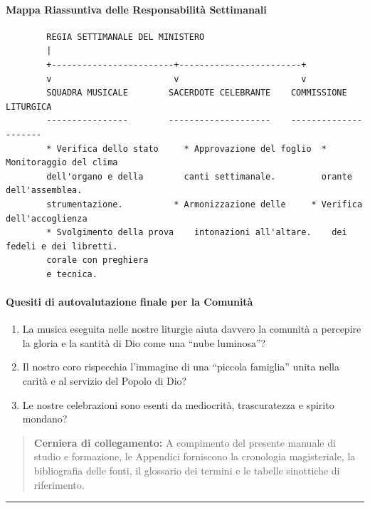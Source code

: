 \documentclass[12pt,a4paper]{article}
\begin{document}
	\paragraph{Mappa Riassuntiva delle Responsabilità Settimanali}\label{mappa-riassuntiva-delle-responsabilita-settimanali}
	
	\begin{verbatim}
		REGIA SETTIMANALE DEL MINISTERO
		|
		+------------------------+------------------------+
		v                        v                        v
		SQUADRA MUSICALE        SACERDOTE CELEBRANTE    COMMISSIONE LITURGICA
		----------------        --------------------    ---------------------
		* Verifica dello stato     * Approvazione del foglio  * Monitoraggio del clima
		dell'organo e della        canti settimanale.         orante dell'assemblea.
		strumentazione.          * Armonizzazione delle     * Verifica dell'accoglienza
		* Svolgimento della prova    intonazioni all'altare.    dei fedeli e dei libretti.
		corale con preghiera
		e tecnica.
	\end{verbatim}
	
	\paragraph{Quesiti di autovalutazione finale per la Comunità}\label{quesiti-di-autovalutazione-finale-per-la-comunita}
	
	\begin{enumerate}[label=\arabic*.,leftmargin=*]
		\item La musica eseguita nelle nostre liturgie aiuta davvero la comunità a percepire la gloria e la santità di Dio come una ``nube luminosa''?
		\item Il nostro coro rispecchia l'immagine di una ``piccola famiglia'' unita nella carità e al servizio del Popolo di Dio?
		\item Le nostre celebrazioni sono esenti da mediocrità, trascuratezza e spirito mondano?
	\end{enumerate}
	
	\begin{quote}
		\textbf{Cerniera di collegamento:} A compimento del presente manuale di studio e formazione, le Appendici forniscono la cronologia magisteriale, la bibliografia delle fonti, il glossario dei termini e le tabelle sinottiche di riferimento.
	\end{quote}
	
	\begin{center}\rule{0.5\linewidth}{0.5pt}\end{center}
	
\end{document}
